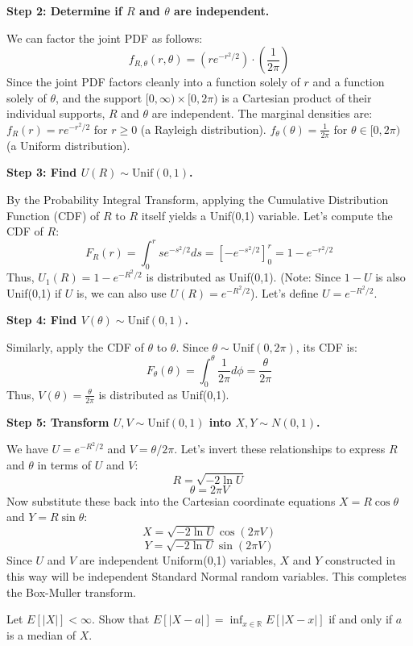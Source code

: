\begin{solution}
\textbf{Step 2: Determine if $R$ and $\theta$ are independent.}

We can factor the joint PDF as follows:
\[ f_{R,\theta}(r, \theta) = \left( r e^{-r^2/2} \right) \cdot \left( \frac{1}{2\pi} \right) \]
Since the joint PDF factors cleanly into a function solely of $r$ and a function solely of $\theta$, and the support $[0, \infty) \times [0, 2\pi)$ is a Cartesian product of their individual supports, $R$ and $\theta$ are independent.
The marginal densities are:
$f_R(r) = r e^{-r^2/2}$ for $r \geq 0$ (a Rayleigh distribution).
$f_\theta(\theta) = \frac{1}{2\pi}$ for $\theta \in [0, 2\pi)$ (a Uniform distribution).

\textbf{Step 3: Find $U(R) \sim \text{Unif}(0,1)$.}

By the Probability Integral Transform, applying the Cumulative Distribution Function (CDF) of $R$ to $R$ itself yields a Unif(0,1) variable.
Let's compute the CDF of $R$:
\[ F_R(r) = \int_0^r s e^{-s^2/2} ds = \left[ -e^{-s^2/2} \right]_0^r = 1 - e^{-r^2/2} \]
Thus, $U_1(R) = 1 - e^{-R^2/2}$ is distributed as Unif(0,1).
(Note: Since $1-U$ is also Unif(0,1) if $U$ is, we can also use $U(R) = e^{-R^2/2}$). Let's define $U = e^{-R^2/2}$.

\textbf{Step 4: Find $V(\theta) \sim \text{Unif}(0,1)$.}

Similarly, apply the CDF of $\theta$ to $\theta$.
Since $\theta \sim \text{Unif}(0, 2\pi)$, its CDF is:
\[ F_\theta(\theta) = \int_0^\theta \frac{1}{2\pi} d\phi = \frac{\theta}{2\pi} \]
Thus, $V(\theta) = \frac{\theta}{2\pi}$ is distributed as Unif(0,1).

\textbf{Step 5: Transform $U, V \sim \text{Unif}(0,1)$ into $X, Y \sim N(0,1)$.}

We have $U = e^{-R^2/2}$ and $V = \theta / 2\pi$.
Let's invert these relationships to express $R$ and $\theta$ in terms of $U$ and $V$:
\[ R = \sqrt{-2 \ln U} \]
\[ \theta = 2\pi V \]
Now substitute these back into the Cartesian coordinate equations $X = R \cos \theta$ and $Y = R \sin \theta$:
\[ X = \sqrt{-2 \ln U} \cos(2\pi V) \]
\[ Y = \sqrt{-2 \ln U} \sin(2\pi V) \]
Since $U$ and $V$ are independent Uniform(0,1) variables, $X$ and $Y$ constructed in this way will be independent Standard Normal random variables. This completes the Box-Muller transform.
\end{solution}

\begin{exercise}\label{probability:2011:8}
Let $E[|X|] < \infty$. Show that $E[|X-a|] = \inf_{x \in \mathbb{R}} E[|X-x|]$ if and only if $a$ is a median of $X$.
\end{exercise}

